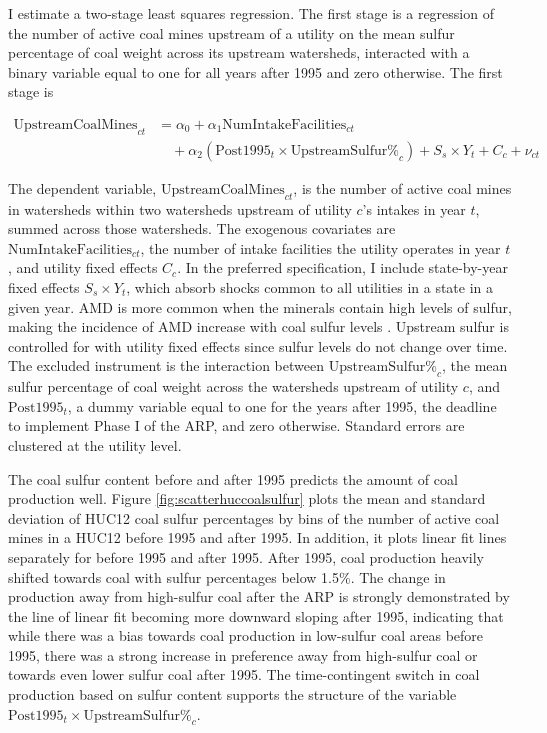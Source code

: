 \documentclass[12pt]{article}
\begin{document}
I estimate a two-stage least squares regression. The first stage is a regression of the number of active coal mines upstream of a utility on the mean sulfur percentage of coal weight across its upstream watersheds, interacted with a binary variable equal to one for all years after 1995 and zero otherwise. The first stage is

\begin{equation}\label{1ststage2sls}
\begin{split}
\text{UpstreamCoalMines}_{ct} &= \alpha_0 + \alpha_1\text{NumIntakeFacilities}_{ct} \\
&\quad + \alpha_2(\text{Post1995}_t \times \text{UpstreamSulfur\%}_c) + S_s\times Y_t + C_c + \nu_{ct}
\end{split}
\end{equation}

The dependent variable, $\text{UpstreamCoalMines}_{ct}$, is the number of active coal mines in watersheds within two watersheds upstream of utility $c$'s intakes in year $t$, summed across those watersheds. The exogenous covariates are $\text{NumIntakeFacilities}_{ct}$, the number of intake facilities the utility operates in year $t$, and utility fixed effects $C_c$. In the preferred specification, I include state-by-year fixed effects $S_s\times Y_t$, which absorb shocks common to all utilities in a state in a given year. AMD is more common when the minerals contain high levels of sulfur, making the incidence of AMD increase with coal sulfur levels \parencite{schweinfurth2009introduction}. Upstream sulfur is controlled for with utility fixed effects since sulfur levels do not change over time. The excluded instrument is the interaction between $\text{UpstreamSulfur\%}_c$, the mean sulfur percentage of coal weight across the watersheds upstream of utility $c$, and $\text{Post1995}_t$, a dummy variable equal to one for the years after 1995, the deadline to implement Phase I of the ARP, and zero otherwise. Standard errors are clustered at the utility level. 

The coal sulfur content before and after 1995 predicts the amount of coal production well. Figure \ref{fig:scatterhuccoalsulfur} plots the mean and standard deviation of HUC12 coal sulfur percentages by bins of the number of active coal mines in a HUC12 before 1995 and after 1995. In addition, it plots linear fit lines separately for before 1995 and after 1995. After 1995, coal production heavily shifted towards coal with sulfur percentages below 1.5\%. The change in production away from high-sulfur coal after the ARP is strongly demonstrated by the line of linear fit becoming more downward sloping after 1995, indicating that while there was a bias towards coal production in low-sulfur coal areas before 1995, there was a strong increase in preference away from high-sulfur coal or towards even lower sulfur coal after 1995. The time-contingent switch in coal production based on sulfur content supports the structure of the variable $\text{Post1995}_t \times \text{UpstreamSulfur\%}_c$.
\end{document}
